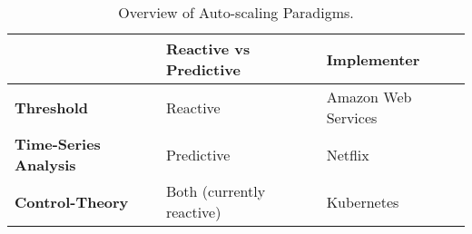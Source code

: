 \begin{table}[]
\centering
\caption{Overview of Auto-scaling
Paradigms.}\label{table:autoscaling-paradigms-comparison-table}
\begin{tabular}{|l|l|l|}
\hline
                    & \textbf{Reactive vs Predictive} & \textbf{Implementer} \\ \hline
\textbf{Threshold}  & Reactive                        & Amazon Web Services
\cite{amazon-auto-scaling-developer-guide}   \\ \hline
\textbf{Time-Series Analysis} & Predictive            & Netflix
\cite{netflix-scryer-part-i}            \\ \hline
\textbf{Control-Theory} & Both (currently reactive)   & Kubernetes
\cite{k8s-horizontal-pod-autoscaler-proposal}         \\ \hline
\end{tabular}
\end{table}

